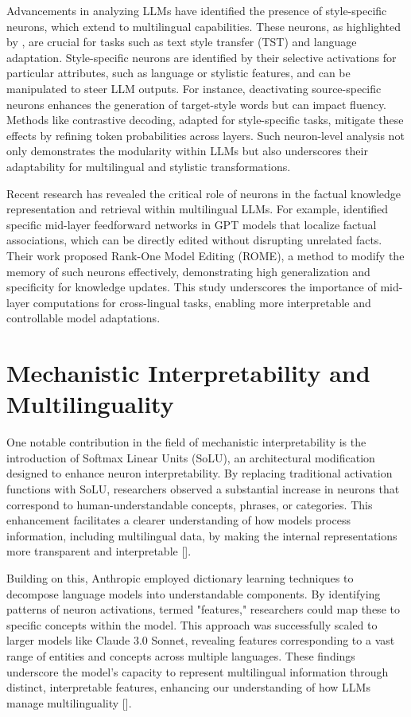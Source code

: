 Advancements in analyzing LLMs have identified the presence of style-specific neurons, which extend to multilingual capabilities. These neurons, as highlighted by \cite{lai2024stylespecific}, are crucial for tasks such as text style transfer (TST) and language adaptation. Style-specific neurons are identified by their selective activations for particular attributes, such as language or stylistic features, and can be manipulated to steer LLM outputs. For instance, deactivating source-specific neurons enhances the generation of target-style words but can impact fluency. Methods like contrastive decoding, adapted for style-specific tasks, mitigate these effects by refining token probabilities across layers. Such neuron-level analysis not only demonstrates the modularity within LLMs but also underscores their adaptability for multilingual and stylistic transformations.

Recent research has revealed the critical role of neurons in the factual knowledge representation and retrieval within multilingual LLMs. For example, \cite{meng2022locating} identified specific mid-layer feedforward networks in GPT models that localize factual associations, which can be directly edited without disrupting unrelated facts. Their work proposed Rank-One Model Editing (ROME), a method to modify the memory of such neurons effectively, demonstrating high generalization and specificity for knowledge updates. This study underscores the importance of mid-layer computations for cross-lingual tasks, enabling more interpretable and controllable model adaptations. 

\section{Mechanistic Interpretability and Multilinguality}

One notable contribution in the field of mechanistic interpretability is the introduction of Softmax Linear Units (SoLU), an architectural modification designed to enhance neuron interpretability. By replacing traditional activation functions with SoLU, researchers observed a substantial increase in neurons that correspond to human-understandable concepts, phrases, or categories. This enhancement facilitates a clearer understanding of how models process information, including multilingual data, by making the internal representations more transparent and interpretable [\cite{elhage2022solu}].

Building on this, Anthropic employed dictionary learning techniques to decompose language models into understandable components. By identifying patterns of neuron activations, termed "features," researchers could map these to specific concepts within the model. This approach was successfully scaled to larger models like Claude 3.0 Sonnet, revealing features corresponding to a vast range of entities and concepts across multiple languages. These findings underscore the model's capacity to represent multilingual information through distinct, interpretable features, enhancing our understanding of how LLMs manage multilinguality [\cite{bricken2023monosemanticity}].

